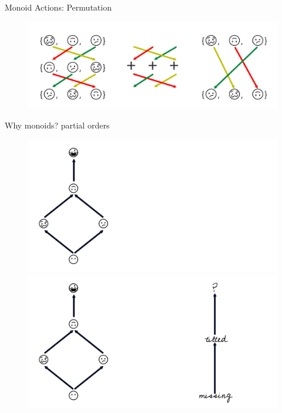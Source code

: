 \documentclass[xcolor={dvipsnames}, handout]{beamer}
\begin{document}
\begin{frame}{Monoid Actions: Permutation}
    \begin{figure}
        \includegraphics[width=1\linewidth]{figures/math/monoid_emoji.png}
    \end{figure}
\end{frame}

\begin{frame}{Why monoids? partial orders}
    \begin{figure}
        \begin{overprint}
            \includegraphics[width=1\linewidth]{figures/math/monoid_hasse.png}
            \includegraphics[width=1\linewidth]{figures/math/monoid_monotone.png}

\end{overprint}
\end{figure}
\end{frame}
\end{document}
